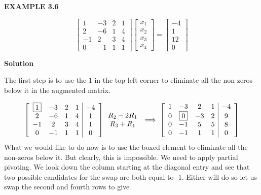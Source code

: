 \documentclass[a4paper, 12pt]{report}
\begin{document}
{     \begin{center}
     	\textbf{EXAMPLE 3.6}
     \end{center}    
     \begin{equation*}
     \begin{bmatrix} 1& -3& 2& 1 \\ 2& -6& 1& 4 \\-1& 2& 3& 4\\0& -1& 1& 1 \end{bmatrix}
     \begin{bmatrix} x_1\\x_2\\x_3\\x_4 \end{bmatrix}
     =
     \begin{bmatrix} -4\\1\\12\\0 \end{bmatrix}
     \end{equation*}
     
     \begin{center}
     	\textbf{Solution}
     \end{center}
      The first step is to use the 1 in the top left corner to eliminate all the non-zeros below it in the augmented matrix.
     
     \[
     \left[ \begin{array}{c c c c| c}
     \boxed{1}& -3& 2& 1& -4\\
     2& -6& 1& 4& 1\\
     -1& 2& 3& 4& 1\\
     0& -1& 1& 1& 0
     \end{array} \right]
     \begin{array}{c}R_2-2R_1\\ R_3+R_1 \end{array}
     \implies
     \left[ \begin{array}{c c c c| c}
     1& -3& 2& 1& -4\\
     0& \boxed{0}& -3& 2& 9\\
     0& -1& 5& 5& 8\\
     0& -1& 1& 1& 0
     \end{array} \right]
     \]
     What we would like to do now is to use the boxed element to eliminate all the non-zeros below it. But clearly, this is impossible. We need to apply partial pivoting. We look down the column starting at the diagonal entry and see that two possible candidates for the swap are both equal to -1. Either will do so let us swap the second and fourth rows to give
     
}
\end{document}
